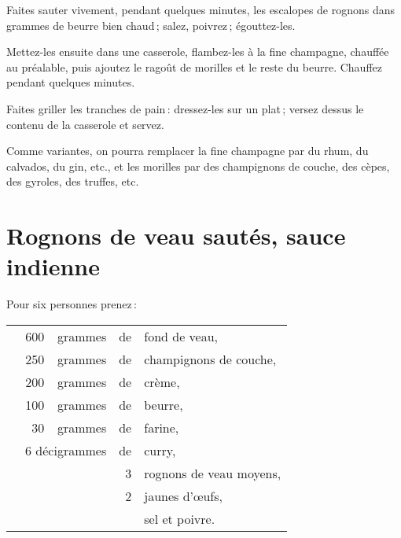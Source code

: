Faites sauter vivement, pendant quelques minutes, les escalopes de rognons dans
{\mmm} grammes de beurre bien chaud ; salez, poivrez ; égouttez-les.

Mettez-les ensuite dans une casserole, flambez-les à la fine champagne, chauffée
au préalable, puis ajoutez le ragoût de morilles et le reste du beurre. Chauffez
pendant quelques minutes.

Faites griller les tranches de pain : dressez-les sur un plat ; versez dessus le
contenu de la casserole et servez.

\sk

Comme variantes, on pourra remplacer la fine champagne par du rhum, du
calvados, du gin, etc., et les morilles par des champignons de couche, des
cèpes, des gyroles, des truffes, etc.

\section*{\centering Rognons de veau sautés, sauce indienne}
{}

Pour six personnes prenez :

\medskip

\footnotesize
\begin{longtable}{rrrrp{18em}}
  & 600 & grammes & de & fond de veau,                                                                    \\
  & 250 & grammes & de & champignons de couche,                                                           \\
  & 200 & grammes & de & crème,                                                                           \\
  & 100 & grammes & de & beurre,                                                                          \\
  &  30 & grammes & de & farine,                                                                          \\
  & \multicolumn{2}{r}{6 décigrammes} & de & curry,                                                       \\
  &     &         &  3 & rognons de veau moyens,                                                          \\
  &     &         &  2 & jaunes d'œufs,                                                                   \\
  &     &         &    & sel et poivre.                                                                   \\
\end{longtable}
\normalsize

